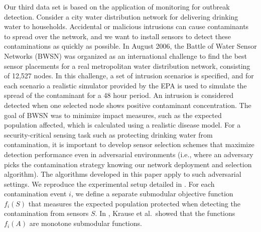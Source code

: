 \documentclass{sig-alternate-dan}
\numberwithin{equation}{section}
\newcommand{\obj}{\ensuremath{f}} %
\renewcommand{\paragraph}[1]{\vspace{3mm}\noindent{\bf #1.} }
\begin{document}
\paragraph{Water network monitoring}
Our third data set is based on the application of monitoring for
outbreak detection.  Consider a city water distribution network for
delivering drinking water to households. Accidental or malicious
intrusions can cause contaminants to spread over the network, and we
want to install sensors to detect these contaminations as quickly as
possible. In August 2006, the Battle of Water Sensor Networks (BWSN)
\cite{ostfeld08bwsn} was organized as an international challenge to
find the best sensor placements for a real metropolitan water
distribution network, consisting of 12,527 nodes. In this challenge, a
set of intrusion scenarios is specified, and for each scenario a
realistic simulator provided by the EPA is used to simulate the spread
of the contaminant for a 48 hour period. An intrusion is considered
detected when one selected node shows positive contaminant
concentration. The goal of BWSN was to minimize impact measures, such
as the expected population affected, which is calculated using a
realistic disease model. For a security-critical sensing task such as
protecting drinking water from contamination, it is important to
develop sensor selection schemes that maximize detection performance
even in adversarial environments (i.e., where an adversary picks the
contamination strategy knowing our network deployment and selection
algorithm). The algorithms developed in this paper apply to such
adversarial settings. We reproduce the experimental setup detailed in
\cite{krause08efficient}. For each contamination event $i$, we define
a separate submodular objective function $f_{i}(S)$ that measures the
expected population protected when detecting the contamination from
sensors $S$.  In \cite{krause08efficient}, Krause et al.~showed that
the functions $\obj_{i}(A)$ are monotone submodular functions.
%
%
%
\end{document}
